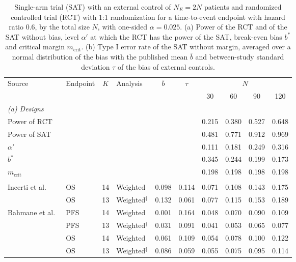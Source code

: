 \begin{table}[!htb]
\centering
\small
\setlength{\tabcolsep}{2.5pt}
\caption{Single-arm trial (SAT) with an external control of $N_E = 2N$ patients and randomized controlled trial (RCT) with 1:1 randomization for a time-to-event endpoint with hazard ratio 0.6, by the total size $N$, with one-sided $\alpha = 0.025$. (a) Power of the RCT and of the SAT without bias, level $\alpha'$ at which the RCT has the power of the SAT, break-even bias $b^{*}$ and critical margin $m_{\mathrm{crit}}$. (b) Type I error rate of the SAT without margin, averaged over a normal distribution of the bias with the published mean $\bar{b}$ and between-study standard deviation $\tau$ of the bias of external controls.}
\label{tab:empirical}
\begin{tabular}{llclcccccc}
\toprule
Source & Endpoint & $K$ & Analysis & $\bar{b}$ & $\tau$ & \multicolumn{4}{c}{$N$} \\
\cmidrule(lr){7-10}
 & & & & & & 30 & 60 & 90 & 120 \\
\midrule
\multicolumn{10}{l}{\textit{(a) Designs}} \\
\multicolumn{6}{l}{Power of RCT} & 0.215 & 0.380 & 0.527 & 0.648 \\
\multicolumn{6}{l}{Power of SAT} & 0.481 & 0.771 & 0.912 & 0.969 \\
\multicolumn{6}{l}{$\alpha'$} & 0.111 & 0.181 & 0.249 & 0.316 \\
\multicolumn{6}{l}{$b^{*}$} & 0.345 & 0.244 & 0.199 & 0.173 \\
\multicolumn{6}{l}{$m_{\mathrm{crit}}$} & 0.198 & 0.198 & 0.198 & 0.198 \\
\addlinespace
\multicolumn{10}{l}{\textit{(b) Type I error rate of the SAT under published estimates of the bias}} \\
Incerti et al.~\cite{Incerti2023} & OS & 14 & Weighted & 0.098 & 0.114 & 0.071 & 0.108 & 0.143 & 0.175 \\
 & OS & 13 & Weighted$^{\ddagger}$ & 0.132 & 0.061 & 0.077 & 0.115 & 0.153 & 0.189 \\
Bahmane et al.~\cite{Bahmane2025} & PFS & 14 & Weighted & 0.001 & 0.164 & 0.048 & 0.070 & 0.090 & 0.109 \\
 & PFS & 13 & Weighted$^{\ddagger}$ & 0.031 & 0.091 & 0.041 & 0.053 & 0.065 & 0.077 \\
 & OS & 14 & Weighted & 0.061 & 0.109 & 0.054 & 0.078 & 0.100 & 0.122 \\
 & OS & 13 & Weighted$^{\ddagger}$ & 0.086 & 0.059 & 0.055 & 0.075 & 0.095 & 0.114 \\

\end{tabular}
\end{table}
